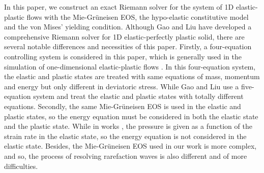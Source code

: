 \documentclass[review]{elsarticle}
\numberwithin{equation}{section}
\numberwithin{table}{section}
\begin{document}
  In this paper, we construct an exact Riemann solver for the system of 1D elastic-plastic flows with the Mie-Gr\"uneisen EOS, the hypo-elastic constitutive model and the von Mises' yielding condition. Although Gao and Liu  \cite{gao20171d,gao2018complete} have developed a comprehensive Riemann solver for 1D elastic-perfectly plastic solid,
  there are several notable differences and necessities of this paper. 
  Firstly,  a four-equation controlling system is considered in this paper, which is generally used in the simulation of one-dimensional elastic-plastic flows \cite{ortega2014numerical,favrie2011dynamics}. In this four-equation system, the elastic and plastic states are treated with same equations of mass, momentum and energy but only different in deviatoric stress. While Gao and Liu \cite{gao20171d,gao2018complete} use a five-equation system and treat the elastic and plastic states with totally different equations.  Secondly, the same Mie-Gr\"uneisen EOS is used in the elastic and plastic states, so the energy equation must be considered in both the elastic state and the plastic state. While in works \cite{gao20171d,gao2018complete}, the pressure is given as a function of the strain rate in the elastic state, so the energy equation is not considered in the elastic state. Besides, the Mie-Gr\"uneisen EOS used in our work is more complex, and so, the process of resolving rarefaction waves is also different and of  more difficulties.
 
 
\end{document}
